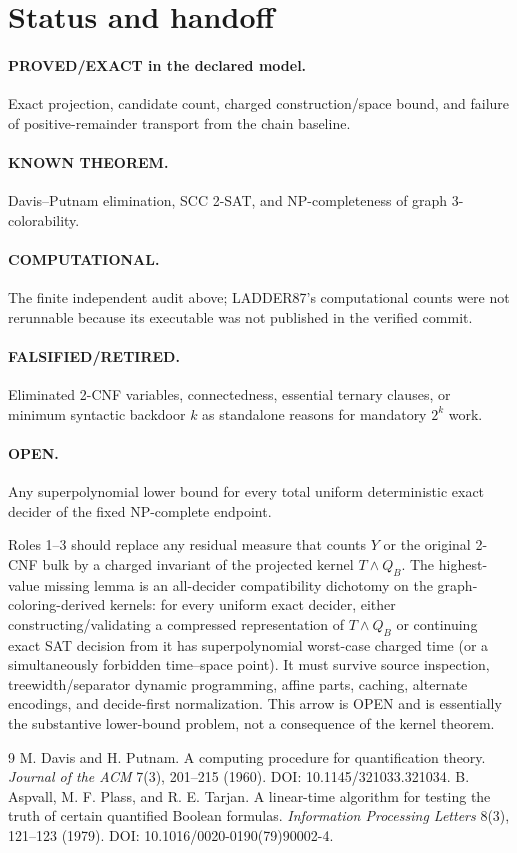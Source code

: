 \documentclass[11pt]{article}
\begin{document}
\section{Status and handoff}
\paragraph{PROVED/EXACT in the declared model.}  Exact projection, candidate
count, charged construction/space bound, and failure of positive-remainder
transport from the chain baseline.
\paragraph{KNOWN THEOREM.}  Davis--Putnam elimination, SCC 2-SAT, and
NP-completeness of graph 3-colorability.
\paragraph{COMPUTATIONAL.}  The finite independent audit above; LADDER87's
computational counts were not rerunnable because its executable was not
published in the verified commit.
\paragraph{FALSIFIED/RETIRED.}  Eliminated 2-CNF variables, connectedness,
essential ternary clauses, or minimum syntactic backdoor $k$ as standalone
reasons for mandatory $2^k$ work.
\paragraph{OPEN.}  Any superpolynomial lower bound for every total uniform
deterministic exact decider of the fixed NP-complete endpoint.

Roles 1--3 should replace any residual measure that counts $Y$ or the original
2-CNF bulk by a charged invariant of the projected kernel $T\wedge Q_B$.
The highest-value missing lemma is an all-decider compatibility dichotomy on
the graph-coloring-derived kernels: for every uniform exact decider, either
constructing/validating a compressed representation of $T\wedge Q_B$ or
continuing exact SAT decision from it has superpolynomial worst-case charged
time (or a simultaneously forbidden time--space point).  It must survive
source inspection, treewidth/separator dynamic programming, affine parts,
caching, alternate encodings, and decide-first normalization.  This arrow is
OPEN and is essentially the substantive lower-bound problem, not a consequence
of the kernel theorem.

\begin{thebibliography}{9}
 M. Davis and H. Putnam. A computing procedure for quantification
theory. \emph{Journal of the ACM} 7(3), 201--215 (1960).
DOI: 10.1145/321033.321034.
 B. Aspvall, M. F. Plass, and R. E. Tarjan. A linear-time
algorithm for testing the truth of certain quantified Boolean formulas.
\emph{Information Processing Letters} 8(3), 121--123 (1979).
DOI: 10.1016/0020-0190(79)90002-4.
\end{thebibliography}
\end{document}
